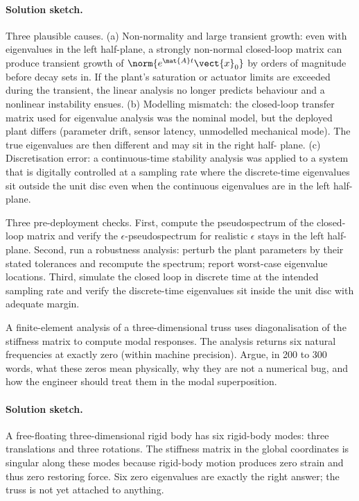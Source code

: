 \paragraph{Solution sketch.}
Three plausible causes. (a) Non-normality and large transient
growth: even with eigenvalues in the left half-plane, a strongly
non-normal closed-loop matrix can produce transient growth of
$\norm{e^{\mat{A} t} \vect{x}_{0}}$ by orders of magnitude before
decay sets in. If the plant's saturation or actuator limits are
exceeded during the transient, the linear analysis no longer
predicts behaviour and a nonlinear instability ensues. (b) Modelling
mismatch: the closed-loop transfer matrix used for eigenvalue
analysis was the nominal model, but the deployed plant differs
(parameter drift, sensor latency, unmodelled mechanical mode). The
true eigenvalues are then different and may sit in the right half-
plane. (c) Discretisation error: a continuous-time stability
analysis was applied to a system that is digitally controlled at a
sampling rate where the discrete-time eigenvalues sit outside the
unit disc even when the continuous eigenvalues are in the left half-
plane.

Three pre-deployment checks. First, compute the pseudospectrum of
the closed-loop matrix and verify the $\epsilon$-pseudospectrum for
realistic $\epsilon$ stays in the left half-plane. Second, run a
robustness analysis: perturb the plant parameters by their stated
tolerances and recompute the spectrum; report worst-case eigenvalue
locations. Third, simulate the closed loop in discrete time at the
intended sampling rate and verify the discrete-time eigenvalues sit
inside the unit disc with adequate margin.

\begin{exercise}
A finite-element analysis of a three-dimensional truss uses
diagonalisation of the stiffness matrix to compute modal responses.
The analysis returns six natural frequencies at exactly zero
(within machine precision). Argue, in 200 to 300 words, what these
zeros mean physically, why they are not a numerical bug, and how
the engineer should treat them in the modal superposition.
\end{exercise}

\paragraph{Solution sketch.}
A free-floating three-dimensional rigid body has six rigid-body
modes: three translations and three rotations. The stiffness matrix
in the global coordinates is singular along these modes because
rigid-body motion produces zero strain and thus zero restoring
force. Six zero eigenvalues are exactly the right answer; the
truss is not yet attached to anything.

